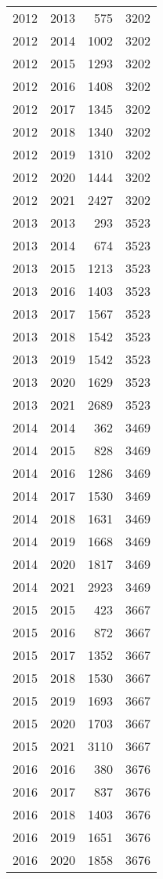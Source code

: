 \documentclass[
  10pt,
  letterpaper,
  DIV=11,
  numbers=noendperiod,
  twoside]{scrartcl}
\begin{document}
\begin{longtable}[]{@{}rrrr@{}}
2012 & 2013 & 575 & 3202 \\
2012 & 2014 & 1002 & 3202 \\
2012 & 2015 & 1293 & 3202 \\
2012 & 2016 & 1408 & 3202 \\
2012 & 2017 & 1345 & 3202 \\
2012 & 2018 & 1340 & 3202 \\
2012 & 2019 & 1310 & 3202 \\
2012 & 2020 & 1444 & 3202 \\
2012 & 2021 & 2427 & 3202 \\
2013 & 2013 & 293 & 3523 \\
2013 & 2014 & 674 & 3523 \\
2013 & 2015 & 1213 & 3523 \\
2013 & 2016 & 1403 & 3523 \\
2013 & 2017 & 1567 & 3523 \\
2013 & 2018 & 1542 & 3523 \\
2013 & 2019 & 1542 & 3523 \\
2013 & 2020 & 1629 & 3523 \\
2013 & 2021 & 2689 & 3523 \\
2014 & 2014 & 362 & 3469 \\
2014 & 2015 & 828 & 3469 \\
2014 & 2016 & 1286 & 3469 \\
2014 & 2017 & 1530 & 3469 \\
2014 & 2018 & 1631 & 3469 \\
2014 & 2019 & 1668 & 3469 \\
2014 & 2020 & 1817 & 3469 \\
2014 & 2021 & 2923 & 3469 \\
2015 & 2015 & 423 & 3667 \\
2015 & 2016 & 872 & 3667 \\
2015 & 2017 & 1352 & 3667 \\
2015 & 2018 & 1530 & 3667 \\
2015 & 2019 & 1693 & 3667 \\
2015 & 2020 & 1703 & 3667 \\
2015 & 2021 & 3110 & 3667 \\
2016 & 2016 & 380 & 3676 \\
2016 & 2017 & 837 & 3676 \\
2016 & 2018 & 1403 & 3676 \\
2016 & 2019 & 1651 & 3676 \\
2016 & 2020 & 1858 & 3676 \\

\end{longtable}
\end{document}
